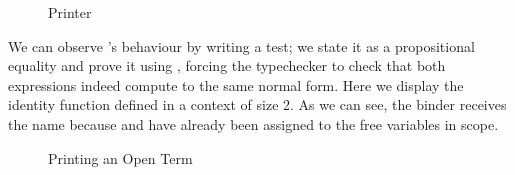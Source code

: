 \begin{figure}[h]
\caption{Printer\label{fig:printer}}
\end{figure}

We can observe 's behaviour by writing a test; we state it as a
propositional equality and prove it using , forcing the typechecker
to check that both expressions indeed compute to the same normal form. Here
we display the identity function defined in a context of size 2. As we can see,
the binder receives the name  because  and  have
already been assigned to the free variables in scope.

\begin{figure}[h]
\caption{Printing an Open Term\label{fig:printtest}}
\end{figure}
